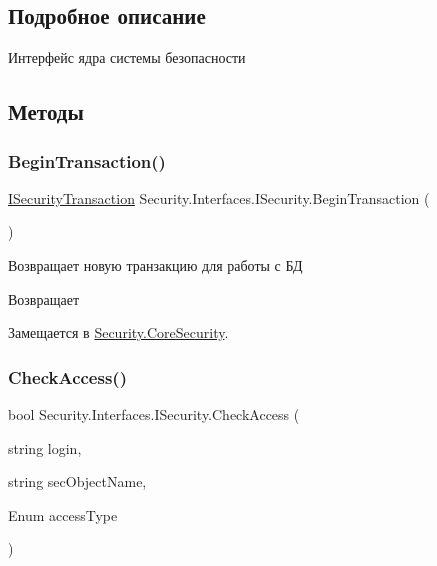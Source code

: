 \subsection{Подробное описание}
Интерфейс ядра системы безопасности 



\subsection{Методы}
\mbox{\label{interface_security_1_1_interfaces_1_1_i_security_aaa904347683f2b6cac529738094112e1}} 
\subsubsection{\texorpdfstring{Begin\+Transaction()}{BeginTransaction()}}
{\footnotesize\ttfamily \hyperlink{interface_security_1_1_interfaces_1_1_i_security_transaction}{I\+Security\+Transaction} Security.\+Interfaces.\+I\+Security.\+Begin\+Transaction (\begin{DoxyParamCaption}{ }\end{DoxyParamCaption})}



Возвращает новую транзакцию для работы с БД 

\begin{DoxyReturn}{Возвращает}

\end{DoxyReturn}


Замещается в \hyperlink{class_security_1_1_core_security_a7dd6592ac290133f4f0182cfef41547b}{Security.\+Core\+Security}.

\mbox{\label{interface_security_1_1_interfaces_1_1_i_security_ad996f672aeed3b4b889707c519e33ddc}} 
\subsubsection{\texorpdfstring{Check\+Access()}{CheckAccess()}\hspace{0.1cm}{\footnotesize\ttfamily [1/4]}}
{\footnotesize\ttfamily bool Security.\+Interfaces.\+I\+Security.\+Check\+Access (\begin{DoxyParamCaption}\item[{string}]{login,  }\item[{string}]{sec\+Object\+Name,  }\item[{Enum}]{access\+Type }\end{DoxyParamCaption})}



